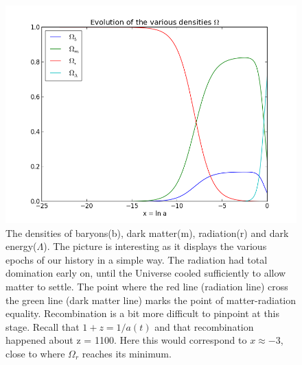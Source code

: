 \documentclass[norsk,a4paper,12pt]{article}
\begin{document}
\begin{figure}[H] 
\begin{center} 
\includegraphics[scale=0.5]{omegaplot.png} 
 

\caption{The densities of baryons(b), dark matter(m), radiation(r) and dark energy($\Lambda$). The picture is interesting as it displays the various epochs of our history in a simple way. The radiation had total domination early on, until the Universe cooled sufficiently to allow matter to settle. The point where the red line (radiation line) cross the green line (dark matter line) marks the point of matter-radiation equality. Recombination is a bit more difficult to pinpoint at this stage. Recall that $1+z = 1/a(t)$ and that recombination happened about z = 1100. Here this would correspond to $x\approx-3$, close to where $\Omega_r$ reaches its minimum.} 
\end{center} 
\end{figure}
\end{document}
